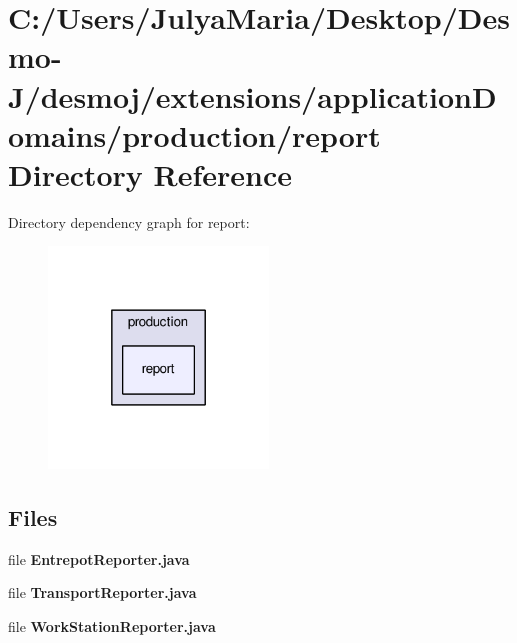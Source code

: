 \section{C\-:/\-Users/\-Julya\-Maria/\-Desktop/\-Desmo-\/\-J/desmoj/extensions/application\-Domains/production/report Directory Reference}
\label{dir_6be7643dd1978e703aef6e9c9222a840}
Directory dependency graph for report\-:
\nopagebreak
\begin{figure}[H]
\begin{center}
\leavevmode
\includegraphics[width=166pt]{dir_6be7643dd1978e703aef6e9c9222a840_dep}
\end{center}
\end{figure}
\subsection*{Files}
\begin{DoxyCompactItemize}
\item 
file {\bfseries Entrepot\-Reporter.\-java}
\item 
file {\bfseries Transport\-Reporter.\-java}
\item 
file {\bfseries Work\-Station\-Reporter.\-java}
\end{DoxyCompactItemize}
